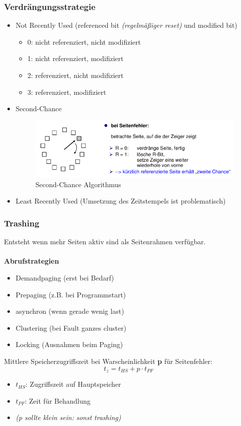 \subsubsection{Verdrängungsstrategie}
\begin{itemize}
    \item Not Recently Used (referenced bit \textit{(regelmäßiger reset)} und modified bit)
    \begin{itemize}
        \item 0: nicht referenziert, nicht modifiziert
        \item 1: nicht referenziert, modifiziert
        \item 2: referenziert, nicht modifiziert
        \item 3: referenziert, modifiziert
    \end{itemize}
    \item Second-Chance
    \begin{figure}[ht!]
        \includegraphics[scale=.3]{pics/second_chance}
        \caption{Second-Chance Algorithmus}
    \end{figure}
    \item Least Recently Used (Umsetzung des Zeitstempels ist problematisch)
\end{itemize}

\subsubsection{Trashing}
Entsteht wenn mehr Seiten aktiv sind als Seitenrahmen verfügbar.\\\\

\textbf{Abrufstrategien}
\begin{itemize}
    \item Demandpaging (erst bei Bedarf)
    \item Prepaging (z.B. bei Programmstart)
    \item asynchron (wenn gerade wenig last)
    \item Clustering (bei Fault ganzes cluster)
    \item Locking (Ausnahmen beim Paging)
\end{itemize}


Mittlere Speicherzugriffszeit bei Warscheinlichkeit \textbf{p} für Seitenfehler:
\begin{equation*}
    t_z = t_{HS} + p \cdot t_{PF}
\end{equation*}
\begin{itemize}
    \item $t_{HS}$: Zugriffszeit auf Hauptspeicher
    \item $t_{PF}$: Zeit für Behandlung
    \item \textit{(p sollte klein sein: sonst trashing)}
\end{itemize}
